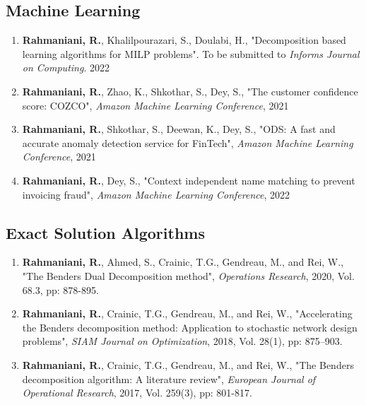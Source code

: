 \documentclass[10PT,letter]{article}
\newcommand{\subsectionstyle}[1]{\normalfont\selectfont\textcolor{titlecol}{\sffamily #1}}
\begin{document}
		\subsection*{\subsectionstyle{Machine Learning}}
		\begin{enumerate}
			\item 	\textbf{Rahmaniani, R.}, Khalilpourazari, S., Doulabi, H., "Decomposition based learning algorithms for MILP problems".  To be submitted to \textit{Informs Journal on Computing}. 2022
			\item \textbf{Rahmaniani, R.}, Zhao, K., Shkothar, S.,  Dey, S., "The customer confidence score: COZCO", \textit{Amazon Machine Learning Conference}, 2021 
			\item \textbf{Rahmaniani, R.}, Shkothar, S., Deewan, K., Dey, S., "ODS: A fast and accurate anomaly detection service for FinTech", \textit{Amazon Machine Learning Conference}, 2021
			\item \textbf{Rahmaniani, R.},  Dey, S., "Context independent name matching to prevent invoicing fraud", \textit{Amazon Machine Learning Conference}, 2022
		\end{enumerate}
        \subsection*{\subsectionstyle{Exact  Solution Algorithms}}
	        \begin{enumerate}[itemsep=.5mm]
					\item 
								\textbf{Rahmaniani, R.}, Ahmed, S., Crainic, T.G., Gendreau, M., and Rei, W., "The Benders Dual Decomposition method", \textit{Operations Research}, 2020, Vol. 68.3, pp: 878-895.
					\item 
								\textbf{Rahmaniani, R.}, Crainic, T.G., Gendreau, M., and Rei, W., "Accelerating the Benders decomposition method: Application to stochastic network design problems", \textit{SIAM Journal on Optimization}, 2018, Vol. 28(1), pp: 875–903.
					\item
								 \textbf{Rahmaniani, R.}, Crainic, T.G., Gendreau, M., and Rei, W., "The Benders decomposition algorithm: A literature review", \textit{European Journal of Operational Research}, 2017, Vol. 259(3), pp: 801-817.
			\end{enumerate}
\end{document}
